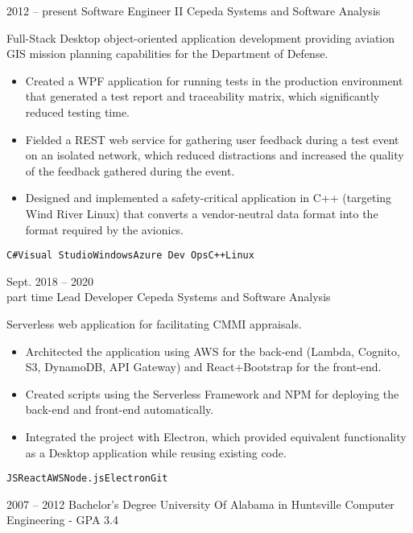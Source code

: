 \documentclass[9pt]{developercv} %
\begin{document}
\begin{entrylist}
	\entry
		{2012 -- present}
		{Software Engineer II}
		{Cepeda Systems and Software Analysis}
		{Full-Stack Desktop object-oriented application development providing aviation GIS mission planning capabilities for the Department of Defense.\\
		\begin{itemize}
			\item Created a WPF application for running tests in the production environment that generated a test report and traceability matrix, which significantly reduced testing time.
			\item Fielded a REST web service for gathering user feedback during a test event on an isolated network, which reduced distractions and increased the quality of the feedback gathered during the event.
			\item Designed and implemented a safety-critical application in C++ (targeting Wind River Linux) that converts a vendor-neutral data format into the format required by the avionics. 
		\end{itemize}
		\texttt{C\#}\slashsep\texttt{Visual Studio}\slashsep\texttt{Windows}\slashsep\texttt{Azure Dev Ops}\slashsep\texttt{C++}\slashsep\texttt{Linux}}
	\entry
		{Sept. 2018 -- 2020\\\footnotesize{part time}}
		{Lead Developer}
		{Cepeda Systems and Software Analysis}
		{Serverless web application for facilitating CMMI appraisals.\\
		\begin{itemize}
			\item Architected the application using AWS for the back-end (Lambda, Cognito, S3, DynamoDB, API Gateway) and React+Bootstrap for the front-end.
			\item Created scripts using the Serverless Framework and NPM for deploying the back-end and front-end automatically. 
			\item Integrated the project with Electron, which provided equivalent functionality as a Desktop application while reusing existing code.
		\end{itemize}
		\texttt{JS}\slashsep\texttt{React}\slashsep\texttt{AWS}\slashsep\texttt{Node.js}\slashsep\texttt{Electron}\slashsep\texttt{Git}}
\end{entrylist}



\begin{entrylist}
	\entry
		{2007 -- 2012}
		{Bachelor's Degree}
		{University Of Alabama in Huntsville}
		{Computer Engineering - GPA 3.4}
\end{entrylist}


\begin{entrylist}
\end{entrylist}
\end{document}

